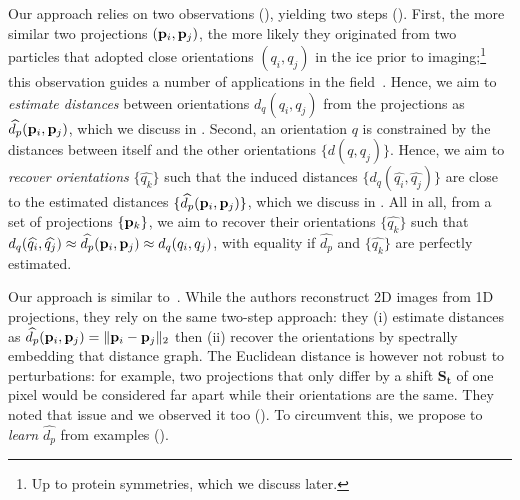 Our approach relies on two observations (), yielding two steps ().
First, the more similar two projections $(\mathbf{p}_i, \mathbf{p}_j)$, the more likely they originated from two particles that adopted close orientations $(q_i, q_j)$ in the ice prior to imaging;\footnote{Up to protein symmetries, which we discuss later.} this observation guides a number of applications in the field~\cite{frank2006three}.
Hence, we aim to \textit{estimate distances} between orientations $d_q(q_i, q_j)$ from the projections as $\widehat{d_p}(\mathbf{p}_i, \mathbf{p}_j)$, which we discuss in .
Second, an orientation $q$ is constrained by the distances between itself and the other orientations $\{ d(q, q_j) \}$.
Hence, we aim to \textit{recover orientations} $\{\widehat{q_k}\}$ such that the induced distances $\{ d_q(\widehat{q_i}, \widehat{q_j}) \}$ are close to the estimated distances $\{ \widehat{d_p}(\mathbf{p}_i, \mathbf{p}_j) \}$, which we discuss in .
All in all, from a set of projections $\{\mathbf{p}_k\}$, we aim to recover their orientations $\{\widehat{q_k}\}$ such that $d_q(\widehat{q_i}, \widehat{q_j}) \approx \widehat{d_p}(\mathbf{p}_i, \mathbf{p}_j) \approx d_q(q_i, q_j)$, with equality if $\widehat{d_p}$ and $\{\widehat{q_k}\}$ are perfectly estimated.

Our approach is similar to~\cite{coifman2008graphprojections}.
While the authors reconstruct 2D images from 1D projections, they rely on the same two-step approach: they (i) estimate distances as $\widehat{d_p}(\mathbf{p}_i, \mathbf{p}_j) = \| \mathbf{p}_i - \mathbf{p}_j \|_2$ then (ii) recover the orientations by spectrally embedding that distance graph.
The Euclidean distance is however not robust to perturbations:
for example, two projections that only differ by a shift $\mathbf{S_t}$ of one pixel would be considered far apart while their orientations are the same.
They noted that issue and we observed it too (). To circumvent this, we propose to \textit{learn} $\widehat{d_p}$ from examples ().

